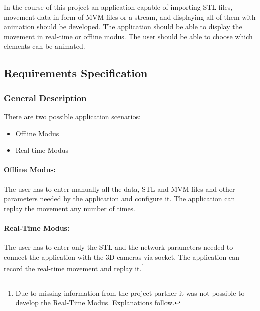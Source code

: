In the course of this project an application capable of importing \gls{STL} files, movement data in form of \gls{MVM} files or a stream, and displaying all of them with animation should be developed. The application should be able to display the movement in real-time or offline modus. The user should be able to choose which elements can be animated.


\subsection{Requirements Specification}
\subsubsection{General Description}
There are two possible application scenarios:
\begin{itemize}
	\item Offline Modus
	\item Real-time Modus
\end{itemize}


\paragraph{Offline Modus:} 
The user has to enter manually all the data, \acrshort{STL} and \acrshort{MVM} files and other parameters needed by the application and configure it. The application can replay the movement any number of times.
\paragraph{Real-Time Modus:} 
The user has to enter only the \acrshort{STL} and the network parameters needed to connect the application with the 3D cameras via socket. The application can record the real-time movement and replay it.\footnote{Due to missing information from the project partner it was not possible to develop the Real-Time Modus. Explanations follow.} 

